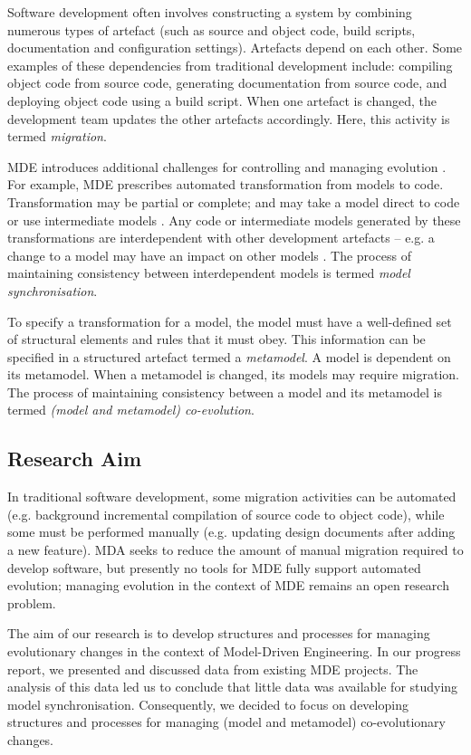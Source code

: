 Software development often involves constructing a system by combining numerous types of artefact (such as source and object code, build scripts, documentation and configuration settings). Artefacts depend on each other. Some examples of these dependencies from traditional development include: compiling object code from source code, generating documentation from source code, and deploying object code using a build script. When one artefact is changed, the development team updates the other artefacts accordingly. Here, this activity is termed \textit{migration}.

MDE introduces additional challenges for controlling and managing evolution \cite{Mens07}. For example, MDE prescribes automated transformation from models to code. Transformation may be partial or complete; and may take a model direct to code or use intermediate models \cite{kleppe03mda}. Any code or intermediate models generated by these transformations are interdependent with other development artefacts -- e.g. a change to a model may have an impact on other models \cite{deursen07mdse}. The process of maintaining consistency between interdependent models is termed \textit{model synchronisation}.

To specify a transformation for a model, the model must have a well-defined set of structural elements and rules that it must obey. This information can be specified in a structured artefact termed a \emph{metamodel}. A model is dependent on its metamodel. When a metamodel is changed, its models may require migration. The process of maintaining consistency between a model and its metamodel is termed \textit{(model and metamodel) co-evolution}.

\subsection{Research Aim}
In traditional software development, some migration activities can be automated (e.g. background incremental compilation of source code to object code), while some must be performed manually (e.g. updating design documents after adding a new feature). MDA seeks to reduce the amount of manual migration required to develop software, but presently no tools for MDE fully support automated evolution; managing evolution in the context of MDE remains an open research problem.

The aim of our research is to develop structures and processes for managing evolutionary changes in the context of Model-Driven Engineering. In our progress report, we presented and discussed data from existing MDE projects. The analysis of this data led us to conclude that little data was available for studying model synchronisation. Consequently, we decided to focus on developing structures and processes for managing (model and metamodel) co-evolutionary changes.